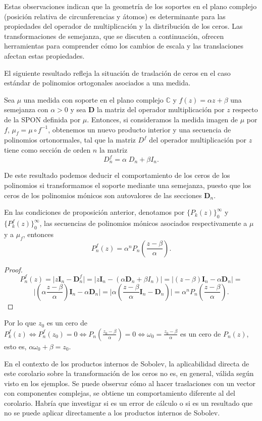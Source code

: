 Estas observaciones indican que la geometría de los soportes en el plano complejo (posición relativa de circunferencias y átomos) es determinante para las propiedades del operador de multiplicación y la distribución de los ceros. Las transformaciones de semejanza, que se discuten a continuación, ofrecen herramientas para comprender cómo los cambios de escala y las translaciones afectan estas propiedades.

El siguiente resultado refleja la situación de traslación de ceros en el caso estándar de polinomios ortogonales asociados a una medida.

\begin{proposition}
	\cite{Escribano2012} Sea $\mu $ una medida con soporte en el plano complejo $\mathbb{C} $ y  $f(z)=\alpha z+\beta $ una semejanza con $\alpha > 0
	$   y sea $\mathbf{D}$ la matriz del operador  multiplicación por $z$ respecto de la SPON definida por $\mu $. Entonces, si consideramos la medida imagen de $\mu $ por $f$, $\mu_{f}=\mu \circ f^{-1}$, obtenemos un nuevo producto interior y una secuencia de polinomios ortonormales, tal que la matriz $D^{f}$ del operador multiplicación por $z$ tiene como sección de orden $n$ la matriz
	\[
		D^{f}_{n} = \alpha\;  D_{n} + \beta I_{n}.
	\]

\end{proposition}
De este resultado podemos deducir el comportamiento de los ceros de los polinomios si transformamos el soporte mediante una semejanza, puesto que  los ceros de los polinomios mónicos  son  autovalores de las secciones $\mathbf{D}_n$.
\begin{corollary}
	En las condiciones de  proposición anterior,
	denotamos por $\{P_{k}(z)\}_{0}^{\infty}$ y $\{P_{k}^{f}(z)\}_{0}^{\infty}$, las secuencias de polinomios mónicos asociados respectivamente a $\mu$ y a $\mu_f$, entonces
	\[
		P_{n}^{f}(z)=\alpha^n P_{n}(\frac{z-\beta}{\alpha}).
	\]
\end{corollary}

\begin{proof}
	\[
		P_{n}^{f}(z)= \vert z \mathbf{I}_{n}-\mathbf{D}^f_{n} \vert =\vert z \mathbf{I}_{n}-(\alpha \mathbf{D}_{n} + \beta I_{n})\vert =
		\vert( z-\beta)\mathbf{I}_{n}-\alpha \mathbf{D}_{n} \vert=
	\]
	\[
		\vert(\alpha\frac{z-\beta}{\alpha} )\mathbf{I}_{n}-\alpha \mathbf{D}_{n} \vert=\vert\alpha(\frac{z-\beta}{\alpha} \mathbf{I}_{n}-\mathbf{D}_{n}) \vert=
		\alpha^n P_{n}(\frac{z-\beta}{\alpha}).
	\]
\end{proof}
Por lo que  $z_0$ es un cero de $P_{k}^{f}(z)\Leftrightarrow P_{n}^{f}(z_0)=0 \Leftrightarrow P_{n}(\frac{z_0-\beta}{\alpha})=0\Leftrightarrow \omega_0=\frac{z_0-\beta}{\alpha}$ es un cero de $P_{n}(z)$, esto es, $\alpha \omega_0+\beta=z_0$.

En el contexto de los productos internos de Sobolev, la aplicabilidad directa de este corolario sobre la transformación de los ceros no es, en general, válida según visto en los ejemplos. Se puede observar cómo al hacer traslaciones con un vector con componentes complejas, se obtiene un comportamiento diferente al del corolario. Habría que investigar si es un error de cálculo o si es un resultado que no se puede aplicar directamente a los productos internos de Sobolev.
